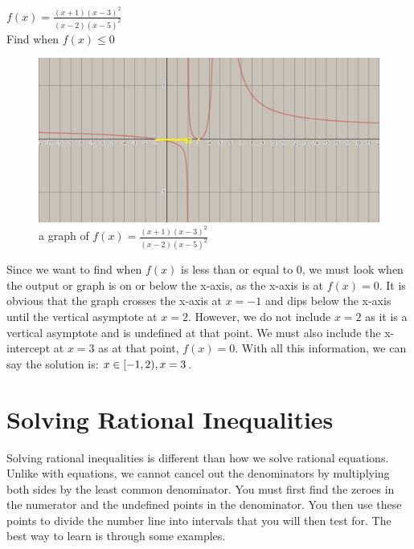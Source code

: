 \documentclass[12pt,fleqn]{book} %
\begin{document}
\vspace*{-2mm}

\begin{center}
\begin{multicols}{2}
    \Large{$f(x) = \frac{(x+1)(x-3)^2}{(x-2)(x-5)^2}$}\\
\columnbreak
    \normalsize{Find when} \Large{$f(x) \leq 0$}
\end{multicols}
\end{center}

\vspace*{-3mm}

\begin{figure}[h]
\centering\includegraphics[scale=0.4]{Pictures/Graph1.png}
\caption{a graph of $f(x) = \frac{(x+1)(x-3)^2}{(x-2)(x-5)^2}$}
\end{figure}

\vspace*{-3mm}

\noindent Since we want to find when $f(x)$ is less than or equal to 0, we must look when the output or graph is on or below the x-axis, as the x-axis is at $f(x) = 0$. It is obvious that the graph crosses the x-axis at $x=-1$ and dips below the x-axis until the vertical asymptote at $x=2$. However, we do not include $x=2$ as it is a vertical asymptote and is undefined at that point. We must also include the x-intercept at $x=3$ as at that point, $f(x) = 0$. With all this information, we can say the solution is: $x\in[-1,2),\space x=3$.


\section{Solving Rational Inequalities}

Solving rational inequalities is different than how we solve rational equations. Unlike with equations, we cannot cancel out the denominators by multiplying both sides by the least common denominator. You must first find the zeroes in the numerator and the undefined points in the denominator. You then use these points to divide the number line into intervals that you will then test for. The best way to learn is through some examples. 
\end{document}
